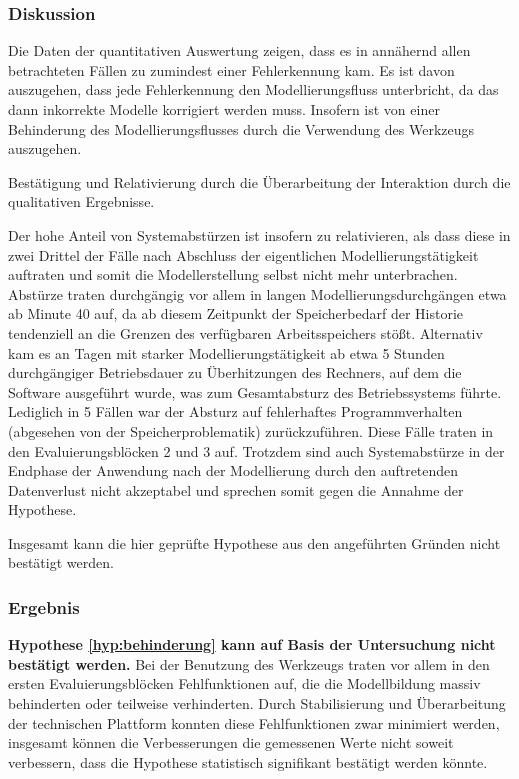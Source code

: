 \subsubsection{Diskussion} 

Die Daten der quantitativen Auswertung zeigen, dass es in annähernd allen betrachteten Fällen zu zumindest einer Fehlerkennung kam. Es ist davon auszugehen, dass jede Fehlerkennung den Modellierungsfluss unterbricht, da das dann inkorrekte Modelle korrigiert werden muss. Insofern ist von einer Behinderung des Modellierungsflusses durch die Verwendung des Werkzeugs auszugehen.

\todo Bestätigung und Relativierung durch die Überarbeitung der Interaktion durch die qualitativen Ergebnisse.

Der hohe Anteil von Systemabstürzen ist insofern zu relativieren, als dass diese in zwei Drittel der Fälle nach Abschluss der eigentlichen Modellierungstätigkeit auftraten und somit die Modellerstellung selbst nicht mehr unterbrachen. Abstürze traten durchgängig vor allem in langen Modellierungsdurchgängen etwa ab Minute 40 auf, da ab diesem Zeitpunkt der Speicherbedarf der Historie tendenziell an die Grenzen des verfügbaren Arbeitsspeichers stößt. Alternativ kam es an Tagen mit starker Modellierungstätigkeit ab etwa 5 Stunden durchgängiger Betriebsdauer zu Überhitzungen des Rechners, auf dem die Software ausgeführt wurde, was zum Gesamtabsturz des Betriebssystems führte. Lediglich in 5 Fällen war der Absturz auf fehlerhaftes Programmverhalten (abgesehen von der Speicherproblematik) zurückzuführen. Diese Fälle traten in den Evaluierungsblöcken 2 und 3 auf. Trotzdem sind auch Systemabstürze in der Endphase der Anwendung nach der Modellierung durch den auftretenden Datenverlust nicht akzeptabel und sprechen somit gegen die Annahme der Hypothese.

Insgesamt kann die hier geprüfte Hypothese aus den angeführten Gründen nicht bestätigt werden.

\subsubsection{Ergebnis} 

\textbf{Hypothese \ref{hyp:behinderung} kann auf Basis der Untersuchung nicht bestätigt werden.} Bei der Benutzung des Werkzeugs traten vor allem in den ersten Evaluierungsblöcken Fehlfunktionen auf, die die Modellbildung massiv behinderten oder teilweise verhinderten. Durch Stabilisierung und Überarbeitung der technischen Plattform konnten diese Fehlfunktionen zwar minimiert werden, insgesamt können die Verbesserungen die gemessenen Werte nicht soweit verbessern, dass die Hypothese statistisch signifikant bestätigt werden könnte.

